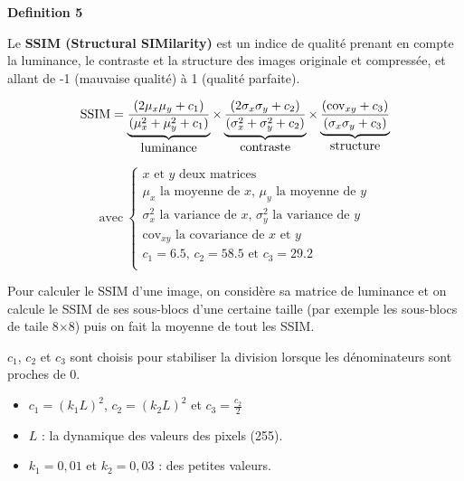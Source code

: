 \documentclass{article}
\newenvironment{mydefinition}[1]{%
  \begin{definitionbox}%
  \noindent\textbf{#1}\par
}{%
  \end{definitionbox}%
}
\begin{document}
\begin{mydefinition}{Definition 5}

    Le \textbf{SSIM (Structural SIMilarity)} est un indice de qualité prenant en compte la luminance, le contraste et la structure des images originale et compressée, et allant de -1 (mauvaise qualité) à 1 (qualité parfaite).
    
    \[
        \text{SSIM} = 
        \underbrace{\frac{(2\mu_x\mu_y + c_1)}{(\mu_x^2 + \mu_y^2 + c_1)}}_{\text{\normalsize luminance}}
        \times
        \underbrace{\frac{(2\sigma_x\sigma_y + c_2)}{(\sigma_x^2 + \sigma_y^2 + c_2)}}_{\text{\normalsize contraste}}
        \times
        \underbrace{\frac{(\text{cov}_{xy} + c_3)}{(\sigma_x\sigma_y + c_3)}}_{\text{\normalsize structure}}
    \]

    \[
        \text{avec} \ 
        \begin{cases}
        \text{$x$ et $y$ deux matrices} \\
        \text{$\mu_x$ la moyenne de $x$, $\mu_y$ la moyenne de $y$} \\
        \text{$\sigma_x^2$ la variance de $x$, $\sigma_y^2$ la variance de $y$} \\
        \text{$\text{cov}_{xy}$ la covariance de $x$ et $y$} \\        
        \text{$c_1 = 6.5$, $c_2 = 58.5$ et $c_3 = 29.2$} \\        
        \end{cases}
    \]
    
\end{mydefinition}


Pour calculer le SSIM d'une image, on considère sa matrice de luminance et on calcule le SSIM de ses sous-blocs d'une certaine taille (par exemple les sous-blocs de taile 8$\times$8) puis on fait la moyenne de tout les SSIM.

\vspace{.3cm}

$c_1$, $c_2$ et $c_3$ sont choisis pour stabiliser la division lorsque les dénominateurs sont proches de 0.
\begin{itemize}[noitemsep,nolistsep]
    \item $c_1 = (k_1 L)^2$, $c_2 = (k_2 L)^2$ et $c_3 = \frac{c_2}{2}$
    \item $L$ : la dynamique des valeurs des pixels (255).
    \item $k_1 = 0,01$ et $k_2 = 0,03$ : des petites valeurs.
\end{itemize}
\end{document}
